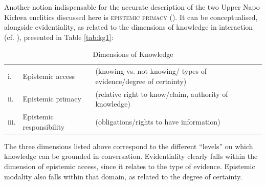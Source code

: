 \documentclass[output=paper]{langscibook}
\begin{document}
Another notion indispensable for the accurate description of the two Upper Napo Kichwa enclitics discussed here is \textsc{epistemic primacy} (\citealt{Stivers2011}). It can be conceptualised, alongside evidentiality, as related to the dimensions of knowledge in interaction (cf. \citealt[13]{Stivers2011}), presented in Table \ref{tab:kg1}:  

\begin{table}
\centering
\begin{tabularx}{\textwidth}{llQ}
i. & Epistemic access & (knowing vs. not knowing/ types of evidence/degree of certainty)\\
ii. & Epistemic primacy & (relative right to know/claim, authority of knowledge)\\
iii. & Epistemic responsibility & (obligations/rights to have information)\\
\end{tabularx}
\caption{Dimensions of Knowledge}\label{fig:kg1}
\end{table}

The three dimensions listed above correspond to the different “levels” on which knowledge can be grounded in conversation. Evidentiality clearly falls within the dimension of epistemic access, since it relates to the type of evidence. Epistemic modality also falls within that domain, as related to the degree of certainty. 
\end{document}
